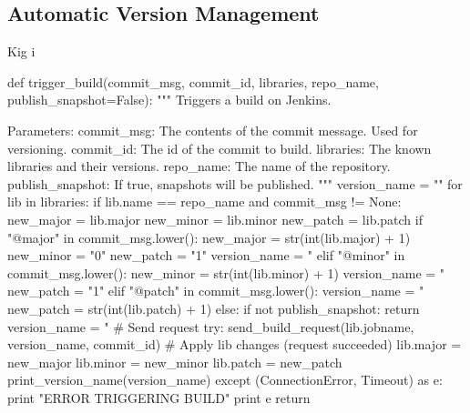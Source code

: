 \subsection{Automatic Version Management}
Kig i 
\begin{pythoncode}[caption=Part of the git hook responsible for setting library version names and triggering Jenkins,label=lst:git_hook_trigger_build]
def trigger_build(commit_msg, commit_id, libraries, repo_name, publish_snapshot=False):
    """
    Triggers a build on Jenkins.

    Parameters:
        commit_msg:       The contents of the commit message. Used for versioning.
        commit_id:        The id of the commit to build.
        libraries:        The known libraries and their versions.
        repo_name:        The name of the repository.
        publish_snapshot: If true, snapshots will be published.
    """
    version_name = ""
    for lib in libraries:
        if lib.name == repo_name and commit_msg != None:
            new_major = lib.major
            new_minor = lib.minor
            new_patch = lib.patch
            if "@major" in commit_msg.lower():
                new_major = str(int(lib.major) + 1)
                new_minor = "0"
                new_patch = "1"
                version_name = "%
            elif "@minor" in commit_msg.lower():
                new_minor = str(int(lib.minor) + 1)
                version_name = "%
                new_patch = "1"
            elif "@patch" in commit_msg.lower():
                version_name = "%
                new_patch = str(int(lib.patch) + 1)
            else:
                if not publish_snapshot:
                    return
                version_name = "%
            # Send request
            try:
                send_build_request(lib.jobname, version_name, commit_id)
                # Apply lib changes (request succeeded)
                lib.major = new_major
                lib.minor = new_minor
                lib.patch = new_patch
                print_version_name(version_name)
            except (ConnectionError, Timeout) as e:
                print "ERROR TRIGGERING BUILD"
                print e
            return
\end{pythoncode}